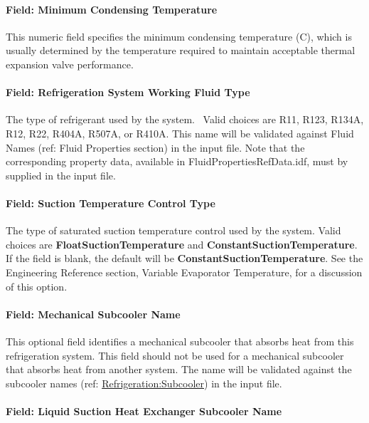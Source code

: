 \paragraph{Field: Minimum Condensing Temperature}\label{field-minimum-condensing-temperature}

This numeric field specifies the minimum condensing temperature (C), which is usually determined by the temperature required to maintain acceptable thermal expansion valve performance.

\paragraph{Field: Refrigeration System Working Fluid Type}\label{field-refrigeration-system-working-fluid-type}

The type of refrigerant used by the system.~ Valid choices are R11, R123, R134A, R12, R22, R404A, R507A, or R410A. This name will be validated against Fluid Names (ref: Fluid Properties section) in the input file. Note that the corresponding property data, available in FluidPropertiesRefData.idf, must by supplied in the input file.

\paragraph{Field: Suction Temperature Control Type}\label{field-suction-temperature-control-type}

The type of saturated suction temperature control used by the system. Valid choices are \textbf{FloatSuctionTemperature} and \textbf{ConstantSuctionTemperature}.~ If the field is blank, the default will be \textbf{ConstantSuctionTemperature}. See the Engineering Reference section, Variable Evaporator Temperature, for a discussion of this option.

\paragraph{Field: Mechanical Subcooler Name}\label{field-mechanical-subcooler-name}

This optional field identifies a mechanical subcooler that absorbs heat from this refrigeration system. This field should not be used for a mechanical subcooler that absorbs heat from another system. The name will be validated against the subcooler names (ref: \hyperref[refrigerationsubcooler]{Refrigeration:Subcooler}) in the input file.

\paragraph{Field: Liquid Suction Heat Exchanger Subcooler Name}\label{field-liquid-suction-heat-exchanger-subcooler-name}

